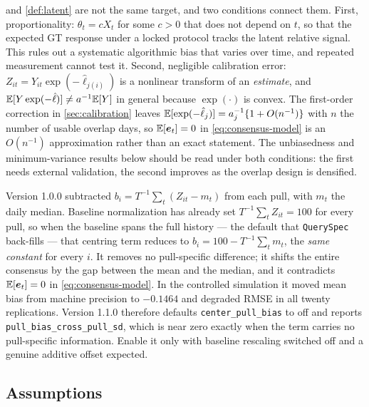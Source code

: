\documentclass[12pt,a4paper,oneside]{article}
\begin{document}
\begin{remark}\label{rem:bridge}
 and \cref{def:latent} are not the same target, and two
conditions connect them. First, proportionality: $\theta_t = cX_t$ for some
$c>0$ that does not depend on $t$, so that the expected GT response under a
locked protocol tracks the latent relative signal. This rules out a
systematic algorithmic bias that varies over time, and repeated measurement
cannot test it. Second, negligible calibration error:
$Z_{it}=Y_{it}\exp(-\hat{\ell}_{j(i)})$ is a nonlinear transform of an
\emph{estimate}, and $\mathbb{E}[Y\exp(-\hat{\ell})] \neq a^{-1}\mathbb{E}[Y]$ in general
because $\exp(\cdot)$ is convex. The first-order correction in
\cref{sec:calibration} leaves
$\mathbb{E}[\exp(-\hat{\ell}_j)] = a_j^{-1}\{1+O(n^{-1})\}$ with $n$ the number of
usable overlap days, so $\mathbb{E}[\bm{e}_t]=0$ in \eqref{eq:consensus-model} is an
$O(n^{-1})$ approximation rather than an exact statement. The unbiasedness and
minimum-variance results below should be read under both conditions: the first
needs external validation, the second improves as the overlap design is
densified.
\end{remark}

\begin{remark}\label{rem:centring}
Version 1.0.0 subtracted $b_i = T^{-1}\sum_t (Z_{it}-m_t)$ from each pull, with
$m_t$ the daily median. Baseline normalization has already set
$T^{-1}\sum_t Z_{it} = 100$ for every pull, so when the baseline spans the full
history --- the default that \texttt{QuerySpec} back-fills --- that centring term
reduces to $b_i = 100 - T^{-1}\sum_t m_t$, the \emph{same constant} for every
$i$. It removes no pull-specific difference; it shifts the entire consensus by
the gap between the mean and the median, and it contradicts $\mathbb{E}[\bm{e}_t]=0$ in
\eqref{eq:consensus-model}. In the controlled simulation it moved mean bias from
machine precision to $-0.1464$ and degraded RMSE in all twenty replications.
Version 1.1.0 therefore defaults \texttt{center\_pull\_bias} to off and reports
\texttt{pull\_bias\_cross\_pull\_sd}, which is near zero exactly when the term
carries no pull-specific information. Enable it only with baseline rescaling
switched off and a genuine additive offset expected.
\end{remark}

\subsection{Assumptions}
\end{document}
